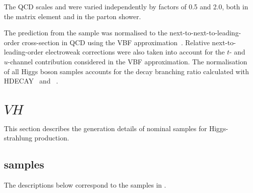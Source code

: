 The QCD scales \muR and \muF were varied independently by factors of 0.5 and 2.0, both in the matrix element 
and in the parton shower.

The prediction from the \POWHEGBOX sample was normalised to the next-to-next-to-leading-order cross-section in QCD 
using the VBF approximation~\cite{Ciccolini:2007jr,Ciccolini:2007ec,Bolzoni:2010xr}. Relative 
next-to-leading-order electroweak corrections were also taken into account for the $t$- and $u$-channel contribution 
considered in the VBF approximation. The normalisation of all Higgs boson samples accounts for the decay branching 
ratio calculated with \textsc{HDECAY}~\cite{Djouadi:1997yw,Spira:1997dg,Djouadi:2006bz} and 
\PROPHECY~\cite{Bredenstein:2006ha,Bredenstein:2006rh,Bredenstein:2006nk}. 


\section{$VH$}

This section describes the generation details of nominal samples for Higgs-strahlung production.

\subsection*{\texorpdfstring{\POWPY[8]}{Powheg+Pythia8} samples}

The descriptions below correspond to the samples in .

